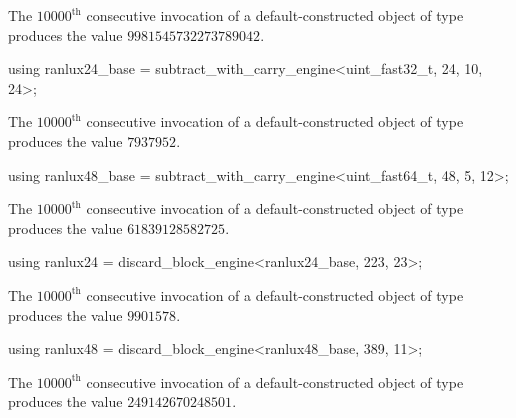\begin{itemdescr}
\pnum
\required
 The $10000^\text{th}$ consecutive invocation
 of a default-constructed object
 of type 
 produces the value $9981545732273789042$.
\end{itemdescr}

%
\begin{itemdecl}
using ranlux24_base =
      subtract_with_carry_engine<uint_fast32_t, 24, 10, 24>;
\end{itemdecl}

\begin{itemdescr}
\pnum
\required
 The $10000^\text{th}$ consecutive invocation
 of a default-constructed object
 of type 
 produces the value
 $7937952$.
\end{itemdescr}

%
\begin{itemdecl}
using ranlux48_base =
      subtract_with_carry_engine<uint_fast64_t, 48, 5, 12>;
\end{itemdecl}

\begin{itemdescr}
\pnum
\required
 The $10000^\text{th}$ consecutive invocation
 of a default-constructed object
 of type 
 produces the value
 $61839128582725$.
\end{itemdescr}

%
\begin{itemdecl}
using ranlux24 = discard_block_engine<ranlux24_base, 223, 23>;
\end{itemdecl}

\begin{itemdescr}
\pnum
\required
 The $10000^\text{th}$ consecutive invocation
 of a default-constructed object
 of type 
 produces the value
 $9901578$.
\end{itemdescr}

%
\begin{itemdecl}
using ranlux48 = discard_block_engine<ranlux48_base, 389, 11>;
\end{itemdecl}

\begin{itemdescr}
\pnum
\required
 The $10000^\text{th}$ consecutive invocation
 of a default-constructed object
 of type 
 produces the value
 $249142670248501$.
\end{itemdescr}


